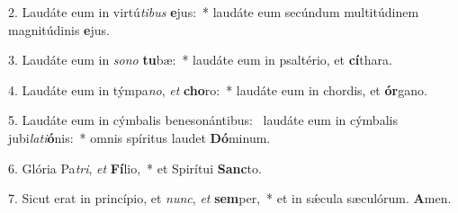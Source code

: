 2. Laudáte eum in virtú\textit{ti}\textit{bus} \textbf{e}jus:~*  laudáte eum secúndum multitúdinem magnitúdinis \textbf{e}jus.\

3. Laudáte eum in \textit{so}\textit{no} \textbf{tu}bæ:~*  laudáte eum in psaltério, et \textbf{cí}thara.\

4. Laudáte eum in týmpa\textit{no}, \textit{et} \textbf{cho}ro:~*  laudáte eum in chordis, et \textbf{ór}gano.\

5. Laudáte eum in cýmbalis benesonántibus: \dag\  laudáte eum in cýmbalis jubi\textit{la}\textit{ti}\textbf{ó}nis:~*  omnis spíritus laudet \textbf{Dó}minum.\

6. Glória Pa\textit{tri}, \textit{et} \textbf{Fí}lio,~*  et Spirítui \textbf{Sanc}to.\

7. Sicut erat in princípio, et \textit{nunc}, \textit{et} \textbf{sem}per,~*  et in sǽcula sæculórum. \textbf{A}men.\

